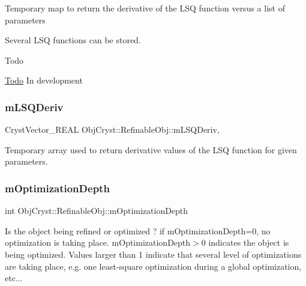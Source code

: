 Temporary map to return the derivative of the L\+SQ function versus a list of parameters

Several L\+SQ functions can be stored.

\begin{DoxyRefDesc}{Todo}
\item[\mbox{\hyperlink{todo__todo000009}{Todo}}]In development \end{DoxyRefDesc}
\mbox{\label{class_obj_cryst_1_1_refinable_obj_a20a9cbc22a6b81f95dc66ebd0ed1668d}} 
\subsubsection{\texorpdfstring{mLSQDeriv}{mLSQDeriv}}
{\footnotesize\ttfamily Cryst\+Vector\+\_\+\+R\+E\+AL Obj\+Cryst\+::\+Refinable\+Obj\+::m\+L\+S\+Q\+Deriv\hspace{0.3cm}{\ttfamily [mutable]}, {\ttfamily [protected]}}

Temporary array used to return derivative values of the L\+SQ function for given parameters. \mbox{\label{class_obj_cryst_1_1_refinable_obj_a920ae46a7d90f940866d35b7548d77a8}} 
\subsubsection{\texorpdfstring{mOptimizationDepth}{mOptimizationDepth}}
{\footnotesize\ttfamily int Obj\+Cryst\+::\+Refinable\+Obj\+::m\+Optimization\+Depth\hspace{0.3cm}{\ttfamily [protected]}}

Is the object being refined or optimized ? if m\+Optimization\+Depth=0, no optimization is taking place. m\+Optimization\+Depth$>$0 indicates the object is being optimized. Values larger than 1 indicate that several level of optimizations are taking place, e.\+g. one least-\/square optimization during a global optimization, etc... \mbox{\label{class_obj_cryst_1_1_refinable_obj_a85a478e7564d71102aedf7c3e81f56d0}} 
